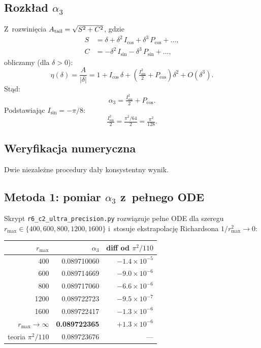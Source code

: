 \subsection*{Rozk\l{}ad $\alpha_3$}

Z~rozwini\k{e}cia $A_{\rm tail} = \sqrt{S^2 + C^2}$, gdzie
\begin{align}
  S &= \delta + \delta^2\,I_{\cos} + \delta^3\,P_{\cos} + \dots, \\
  C &= -\delta^2\,I_{\sin} - \delta^3\,P_{\sin} + \dots,
\end{align}
obliczamy (dla $\delta > 0$):
\begin{equation}
  \eta(\delta) = \frac{A}{|\delta|} = 1 + I_{\cos}\,\delta + \left(\tfrac{I_{\sin}^2}{2} + P_{\cos}\right)\delta^2 + O(\delta^3).
  \label{eq:T6-alpha3-full}
\end{equation}
St\k{a}d:
\begin{equation}
  \boxed{\;\alpha_3 = \tfrac{I_{\sin}^2}{2} + P_{\cos}.\;}
\end{equation}
Podstawiaj\k{a}c $I_{\sin} = -\pi/8$:
\begin{equation}
  \tfrac{I_{\sin}^2}{2} = \tfrac{\pi^2/64}{2} = \tfrac{\pi^2}{128}.
\end{equation}

\subsection{Weryfikacja numeryczna}
\label{sec:T6-numerics}

Dwie niezale\.zne procedury da\l{}y konsystentny wynik.

\subsection*{Metoda 1: pomiar $\alpha_3$ z~pe\l{}nego ODE}

Skrypt \texttt{r6\_c2\_ultra\_precision.py} rozwi\k{a}zuje pe\l{}ne ODE dla
szeregu $r_{\max} \in \{400, 600, 800, 1200, 1600\}$ i~stosuje ekstrapolacj\k{e}
Richardsona $1/r_{\max}^2 \to 0$:
\begin{center}
\begin{tabular}{r|rr}
\hline
$r_{\max}$ & $\alpha_3$ & diff od $\pi^2/110$ \\
\hline
 400  & 0.089710060 & $-1.4 \times 10^{-5}$ \\
 600  & 0.089714669 & $-9.0 \times 10^{-6}$ \\
 800  & 0.089717060 & $-6.6 \times 10^{-6}$ \\
1200  & 0.089722723 & $-9.5 \times 10^{-7}$ \\
1600  & 0.089722417 & $-1.3 \times 10^{-6}$ \\
\hline
$r_{\max} \to \infty$ & \textbf{0.089722365} & $+1.3 \times 10^{-6}$ \\
teoria $\pi^2/110$ & 0.089723676 & --- \\
\hline
\end{tabular}
\end{center}

